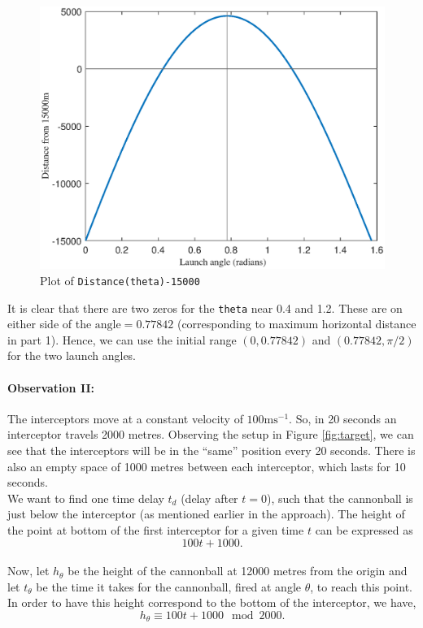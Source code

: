 \documentclass[11pt]{report}
\begin{document}
 \begin{figure}[h]
	\centering
  	\includegraphics[scale=0.5]{assets/fzero_theta.eps}
  	\caption{Plot of \texttt{Distance(theta)-15000}}
  	\label{fig:fzero}
\end{figure}

It is clear that there are two zeros for the \texttt{theta} near 0.4 and 1.2. These are on either side of the $\text{angle}=0.77842$ (corresponding to maximum horizontal distance in part 1). Hence, we can use the initial range $(0, 0.77842)$ and $(0.77842, \pi/2)$ for the two launch angles.

\paragraph{Observation II:} The interceptors move at a constant velocity of $100\text{ms}^{-1}$. So, in 20 seconds an interceptor travels 2000 metres. Observing the setup in Figure \ref{fig:target}, we can see that the interceptors will be in the ``same'' position every 20 seconds. There is also an empty space of 1000 metres between each interceptor, which lasts for 10 seconds. \\

We want to find one time delay $t_d$ (delay after $t=0$), such that the cannonball is just below the interceptor (as mentioned earlier in the approach). The height of the point at bottom of the first interceptor for a given time $t$ can be expressed as $$ 100t + 1000. $$\\

Now, let $h_{\theta}$ be the height of the cannonball at 12000 metres from the origin and let $t_{\theta}$ be the time it takes for the cannonball, fired at angle $\theta$, to reach this point. In order to have this height correspond to the bottom of the interceptor, we have, $$h_{\theta} \equiv 100t + 1000 \mod 2000.$$ \\
\end{document}
